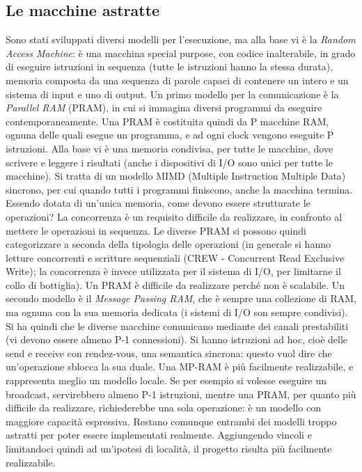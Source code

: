 \subsection{Le macchine astratte}
Sono stati sviluppati diversi modelli per l'esecuzione, ma alla base vi è la
\textit{Random Access Machine}: è una macchina special purpose, con codice
inalterabile, in grado di eseguire istruzioni in sequenza (tutte le istruzioni
hanno la stessa durata), memoria composta da una sequenza di parole capaci di
contenere un intero e un sistema di input e uno di output.
Un primo modello per la comunicazione è la \textit{Parallel RAM} (PRAM), in cui
si immagina diversi programmi da eseguire contemporaneamente. Una PRAM è
costituita quindi da P macchine RAM, ognuna delle quali esegue un programma, e
ad ogni clock vengono eseguite P istruzioni. Alla base vi è una memoria
condivisa, per tutte le macchine, dove scrivere e leggere i risultati (anche i
dispositivi di I/O sono unici per tutte le macchine). Si tratta di un modello
MIMD (Multiple Instruction Multiple Data) sincrono, per cui quando tutti i
programmi finiscono, anche la macchina termina. Essendo dotata di un'unica
memoria, come devono essere strutturate le operazioni? La concorrenza è un
requisito difficile da realizzare, in confronto al mettere le operazioni in
sequenza. Le diverse PRAM si possono quindi categorizzare a seconda della
tipologia delle operazioni (in generale si hanno letture concorrenti e scritture
sequenziali (CREW - Concurrent Read Exclusive Write); la concorrenza è invece
utilizzata per il sistema di I/O, per limitarne il collo di bottiglia). Un PRAM
è difficile da realizzare perché non è scalabile.
Un secondo modello è il \textit{Message Passing RAM}, che è sempre una
collezione di RAM, ma ognuna con la sua memoria dedicata (i sistemi di I/O son
sempre condivisi). Si ha quindi che le diverse macchine comunicano mediante dei
canali prestabiliti (vi devono essere almeno P-1 connessioni). Si hanno
istruzioni ad hoc, cioè delle send e receive con rendez-vous, una semantica
sincrona: questo vuol dire che un'operazione sblocca la sua duale. Una MP-RAM è
più facilmente realizzabile, e rappresenta meglio un modello locale. Se per
esempio si volesse eseguire un broadcast,
servirebbero almeno P-1 istruzioni, mentre una PRAM, per quanto più difficile
da realizzare, richiederebbe una sola operazione: è un modello con maggiore
capacità espressiva. Restano comunque entrambi dei modelli troppo astratti per
poter essere implementati realmente. Aggiungendo vincoli e limitandoci quindi ad un'ipotesi di località, il progetto
risulta più facilmente realizzabile.
